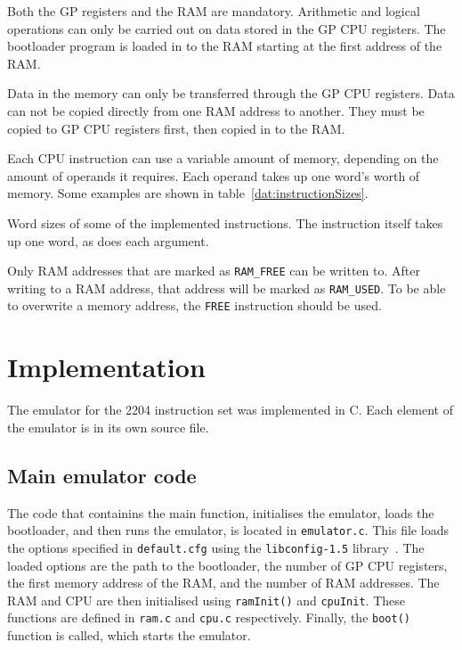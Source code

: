 \documentclass[a4paper,11pt]{article}
\begin{document}
    Both the GP registers and the RAM are mandatory. Arithmetic and logical operations can only be carried out on data stored in the GP CPU registers. The bootloader program is loaded in to the RAM starting at the first address of the RAM.
    
    Data in the memory can only be transferred through the GP CPU registers. Data can not be copied directly from one RAM address to another. They must be copied to GP CPU registers first, then copied in to the RAM.
    
    Each CPU instruction can use a variable amount of memory, depending on the amount of operands it requires. Each operand takes up one word's worth of memory. Some examples are shown in table~\ref{dat:instructionSizes}.
    
    \begin{table}[h]
    \centering
        \label{dat:instructionSizes}
        \caption{Word sizes of some of the implemented instructions. The instruction itself takes up one word, as does each argument.}
    \end{table}
    
    Only RAM addresses that are marked as \lstinline{RAM_FREE} can be written to. After writing to a RAM address, that address will be marked as \lstinline{RAM_USED}. To be able to overwrite a memory address, the \lstinline{FREE} instruction should be used.

\section{Implementation}
    The emulator for the 2204 instruction set was implemented in C. Each element of the emulator is in its own source file.
    
    \subsection{Main emulator code}
        The code that containins the main function, initialises the emulator, loads the bootloader, and then runs the emulator, is located in \lstinline{emulator.c}. This file loads the options specified in \lstinline{default.cfg} using the \lstinline{libconfig-1.5} library~\cite{libconfig}. The loaded options are the path to the bootloader, the number of GP CPU registers, the first memory address of the RAM, and the number of RAM addresses. The RAM and CPU are then initialised using \lstinline{ramInit()} and \lstinline{cpuInit}. These functions are defined in \lstinline{ram.c} and \lstinline{cpu.c} respectively. Finally, the \lstinline{boot()} function is called, which starts the emulator.
    
\end{document}
